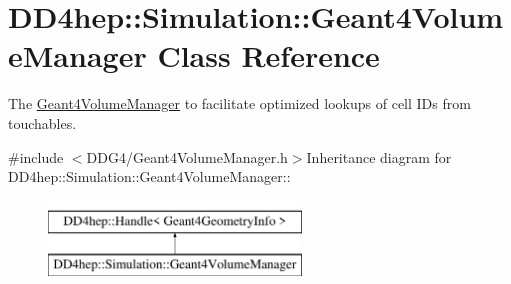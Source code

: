 \hypertarget{class_d_d4hep_1_1_simulation_1_1_geant4_volume_manager}{
\section{DD4hep::Simulation::Geant4VolumeManager Class Reference}
\label{class_d_d4hep_1_1_simulation_1_1_geant4_volume_manager}
}


The \hyperlink{class_d_d4hep_1_1_simulation_1_1_geant4_volume_manager}{Geant4VolumeManager} to facilitate optimized lookups of cell IDs from touchables.  


{\ttfamily \#include $<$DDG4/Geant4VolumeManager.h$>$}Inheritance diagram for DD4hep::Simulation::Geant4VolumeManager::\begin{figure}[H]
\begin{center}
\leavevmode
\includegraphics[height=2cm]{class_d_d4hep_1_1_simulation_1_1_geant4_volume_manager}
\end{center}
\end{figure}
